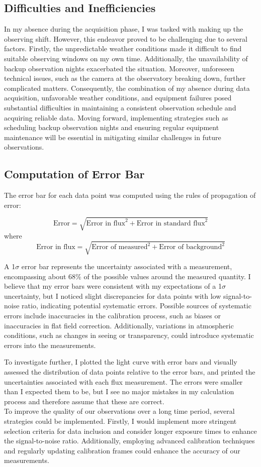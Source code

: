 \documentclass[]{aastex63}
\begin{document}
\subsection{Difficulties and Inefficiencies}
In my absence during the acquisition phase, I was tasked with making up the observing shift. However, this endeavor proved to be challenging due to several factors. Firstly, the unpredictable weather conditions made it difficult to find suitable observing windows on my own time. Additionally, the unavailability of backup observation nights exacerbated the situation. Moreover, unforeseen technical issues, such as the camera at the observatory breaking down, further complicated matters. Consequently, the combination of my absence during data acquisition, unfavorable weather conditions, and equipment failures posed substantial difficulties in maintaining a consistent observation schedule and acquiring reliable data. Moving forward, implementing strategies such as scheduling backup observation nights and ensuring regular equipment maintenance will be essential in mitigating similar challenges in future observations.

\subsection{Computation of Error Bar}
The error bar for each data point was computed using the rules of propagation of error:

\[
\text{Error} = \sqrt{\text{Error in flux}^2 + \text{Error in standard flux}^2}
\]
where
\[
\text{Error in flux} = \sqrt{\text{Error of measured}^2 + \text{Error of background}^2}
\]

A 1$\sigma$ error bar represents the uncertainty associated with a measurement, encompassing about 68\% of the possible values around the measured quantity. I believe that my error bars were consistent with my expectations of a 1$\sigma$ uncertainty, but I noticed slight discrepancies for data points with low signal-to-noise ratio, indicating potential systematic errors. Possible sources of systematic errors include inaccuracies in the calibration process, such as biases or inaccuracies in flat field correction. Additionally, variations in atmospheric conditions, such as changes in seeing or transparency, could introduce systematic errors into the measurements.

To investigate further, I plotted the light curve with error bars and visually assessed the distribution of data points relative to the error bars, and printed the uncertainties associated with each flux measurement. The errors were smaller than I expected them to be, but I see no major mistakes in my calculation process and therefore assume that these are correct.
\\
To improve the quality of our observations over a long time period, several strategies could be implemented. Firstly, I would implement more stringent selection criteria for data inclusion and consider longer exposure times to enhance the signal-to-noise ratio. Additionally, employing advanced calibration techniques and regularly updating calibration frames could enhance the accuracy of our measurements.
\end{document}
